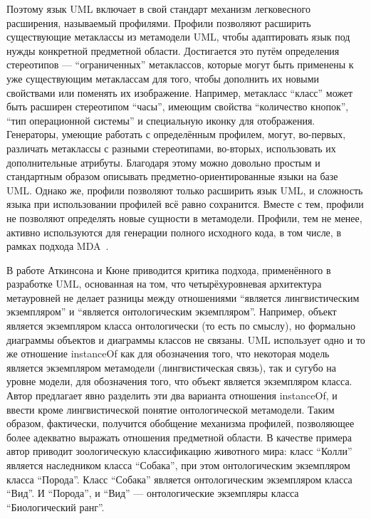 Поэтому язык UML включает в свой стандарт механизм легковесного расширения, называемый 
профилями. Профили позволяют расширить существующие метаклассы из метамодели UML, 
чтобы адаптировать язык под нужды конкретной предметной области. Достигается это путём 
определения стереотипов --- "`ограниченных"' метаклассов, которые могут быть применены 
к уже существующим метаклассам для того, чтобы дополнить их новыми свойствами или 
поменять их изображение. Например, метакласс "`класс"' может быть расширен стереотипом 
"`часы"', имеющим свойства "`количество кнопок"', "`тип операционной системы"' и специальную 
иконку для отображения. Генераторы, умеющие работать с определённым профилем, могут, 
во-первых, различать метаклассы с разными стереотипами, во-вторых, использовать их 
дополнительные атрибуты. Благодаря этому можно довольно простым и стандартным образом 
описывать предметно-ориентированные языки на базе UML. Однако же, профили позволяют 
только расширить язык UML, и сложность языка при использовании профилей всё равно 
сохранится. Вместе с тем, профили не позволяют определять новые сущности в метамодели. 
Профили, тем не менее, активно используются для генерации полного исходного кода, 
в том числе, в рамках подхода MDA~\cite{swithinbank2005patterns}.

В работе Аткинсона и Кюне \cite{atkinson2003model} приводится критика подхода, применённого в разработке UML, 
основанная на том, что четырёхуровневая архитектура метауровней не делает разницы между отношениями 
"`является лингвистическим экземпляром"' и "`является онтологическим экземпляром"'. 
Например, объект является экземпляром класса онтологически (то есть по смыслу), но 
формально диаграммы объектов и диаграммы классов не связаны. UML использует одно и 
то же отношение instanceOf как для обозначения того, что некоторая модель является 
экземпляром метамодели (лингвистическая связь), так и сугубо на уровне модели, для 
обозначения того, что объект является экземпляром класса. Автор предлагает явно разделить 
эти два варианта отношения instanceOf, и ввести кроме лингвистической понятие онтологической 
метамодели. Таким образом, фактически, получится обобщение механизма профилей, позволяющее
более адекватно выражать отношения предметной области. В качестве примера автор приводит 
зоологическую классификацию животного мира: класс "`Колли"' является наследником класса 
"`Собака"', при этом онтологическим экземпляром класса "`Порода"'. Класс "`Собака"' 
является онтологическим экземпляром класса "`Вид"'. И "`Порода"', и "`Вид"' --- онтологические 
экземпляры класса "`Биологический ранг"'.


